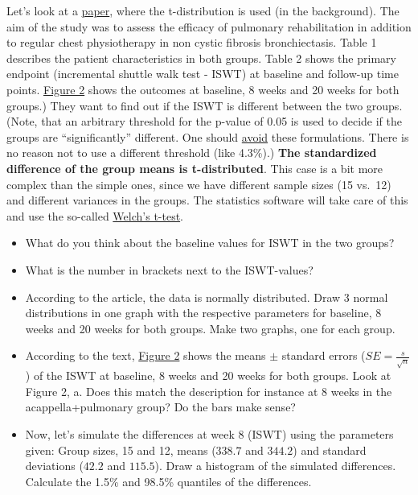 \documentclass[
]{book}
\providecommand{\tightlist}{%
  \setlength{\itemsep}{0pt}\setlength{\parskip}{0pt}}
\begin{document}
Let's look at a \href{https://www.sciencedirect.com/science/article/pii/S0954611112002958\#aep-abstract-id3}{paper},
where the t-distribution is used (in the background). The aim of the study was to assess the efficacy of pulmonary
rehabilitation in addition to regular chest physiotherapy in non cystic fibrosis bronchiectasis.
Table 1 describes the patient characteristics in both groups.
Table 2 shows the primary endpoint (incremental shuttle walk test - ISWT) at baseline and follow-up time points.
\href{https://ars.els-cdn.com/content/image/1-s2.0-S0954611112002958-gr2_lrg.jpg}{Figure 2} shows the outcomes
at baseline, 8 weeks and 20 weeks for both groups.)
They want to find out if the ISWT is different between the two groups.
(Note, that an arbitrary threshold for the p-value of 0.05 is used to decide if the groups
are ``significantly'' different. One should \href{https://www.tandfonline.com/doi/full/10.1080/00031305.2019.1583913}{avoid} these formulations.
There is no reason not to use a different threshold (like 4.3\%).)
\textbf{The standardized difference of the group means is t-distributed}. This case is a bit more complex than the simple ones,
since we have different sample sizes (15 vs.~12) and different variances in the groups. The statistics software will take care of this
and use the so-called \href{https://en.wikipedia.org/wiki/Welch\%27s_t-test}{Welch's t-test}.

\begin{itemize}
\tightlist
\item
  What do you think about the baseline values for ISWT in the two groups?
\item
  What is the number in brackets next to the ISWT-values?
\item
  According to the article, the data is normally distributed. Draw 3 normal distributions in one graph with the respective parameters
  for baseline, 8 weeks and 20 weeks for both groups. Make two graphs, one for each group.
\item
  According to the text, \href{https://ars.els-cdn.com/content/image/1-s2.0-S0954611112002958-gr2_lrg.jpg}{Figure 2} shows the means
  \(\pm\) standard errors (\(SE = \frac{s}{\sqrt{n}}\)) of the ISWT at baseline, 8 weeks and 20 weeks for both groups. Look at Figure 2, a.
  Does this match the description for instance at 8 weeks in the acappella+pulmonary group? Do the bars make sense?
\item
  Now, let's simulate the differences at week 8 (ISWT) using the parameters given: Group sizes, 15 and 12,
  means (\(338.7\) and \(344.2\)) and standard deviations (\(42.2\) and \(115.5\)).
  Draw a histogram of the simulated differences.
  Calculate the 1.5\% and 98.5\% quantiles of the differences.
\end{itemize}
\end{document}
